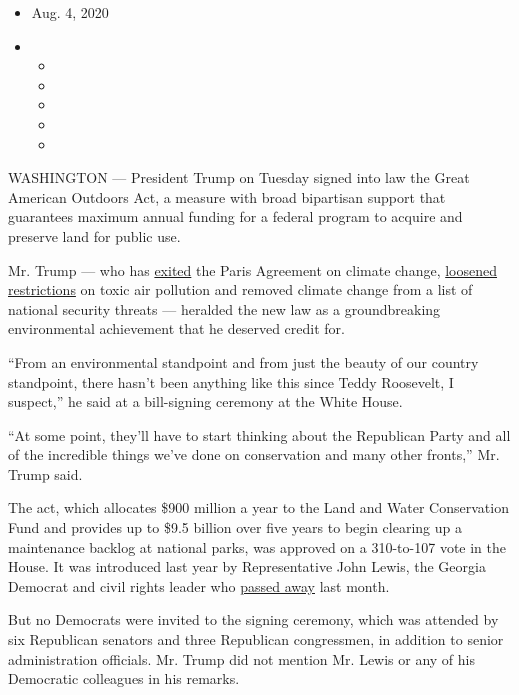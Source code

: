 \begin{itemize}
\item
  Aug. 4, 2020
\item
  \begin{itemize}
  \item
  \item
  \item
  \item
  \item
  \end{itemize}
\end{itemize}

WASHINGTON --- President Trump on Tuesday signed into law the Great
American Outdoors Act, a measure with broad bipartisan support that
guarantees maximum annual funding for a federal program to acquire and
preserve land for public use.

Mr. Trump --- who has
\href{https://www.nytimes3xbfgragh.onion/2019/11/04/climate/trump-paris-agreement-climate.html}{exited}
the Paris Agreement on climate change,
\href{https://www.nytimes3xbfgragh.onion/2020/06/04/climate/trump-environment-coronavirus.html}{loosened
restrictions} on toxic air pollution and removed climate change from a
list of national security threats --- heralded the new law as a
groundbreaking environmental achievement that he deserved credit for.

``From an environmental standpoint and from just the beauty of our
country standpoint, there hasn't been anything like this since Teddy
Roosevelt, I suspect,'' he said at a bill-signing ceremony at the White
House.

``At some point, they'll have to start thinking about the Republican
Party and all of the incredible things we've done on conservation and
many other fronts,'' Mr. Trump said.

The act, which allocates \$900 million a year to the Land and Water
Conservation Fund and provides up to \$9.5 billion over five years to
begin clearing up a maintenance backlog at national parks, was approved
on a 310-to-107 vote in the House. It was introduced last year by
Representative John Lewis, the Georgia Democrat and civil rights leader
who
\href{https://www.nytimes3xbfgragh.onion/2020/07/17/us/john-lewis-dead.html}{passed
away} last month.

But no Democrats were invited to the signing ceremony, which was
attended by six Republican senators and three Republican congressmen, in
addition to senior administration officials. Mr. Trump did not mention
Mr. Lewis or any of his Democratic colleagues in his remarks.

